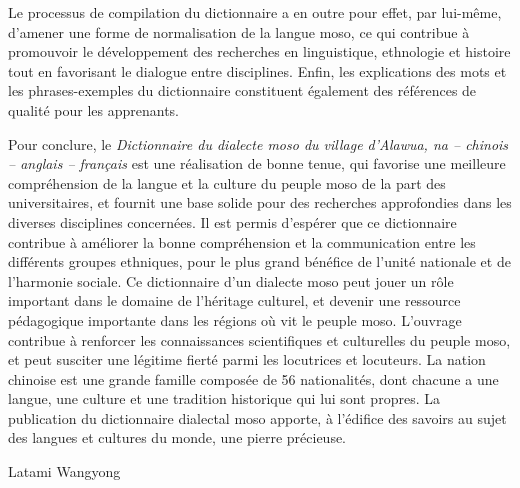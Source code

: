 Le processus de compilation du dictionnaire a en outre pour effet, par lui-même, d’amener une forme de normalisation de la langue moso, ce qui contribue à promouvoir le développement des recherches en linguistique, ethnologie et histoire tout en favorisant le dialogue entre disciplines. Enfin, les explications des mots et les phrases-exemples du dictionnaire constituent également des références de qualité pour les apprenants.

Pour conclure, le \emph{Dictionnaire du dialecte moso du village d'Alawua, na – chinois – anglais – français} est une réalisation de bonne tenue, qui favorise une meilleure compréhension de la langue et la culture du peuple moso de la part des universitaires, et fournit une base solide pour des recherches approfondies dans les diverses disciplines concernées. Il est permis d’espérer que ce dictionnaire contribue à améliorer la bonne compréhension et la communication entre les différents groupes ethniques, pour le plus grand bénéfice de l'unité nationale et de l'harmonie sociale. Ce dictionnaire d’un dialecte moso peut jouer un rôle important dans le domaine de l'héritage culturel, et devenir une ressource pédagogique importante dans les régions où vit le peuple moso. L’ouvrage contribue à renforcer les connaissances scientifiques et culturelles du peuple moso, et peut susciter une légitime fierté parmi les locutrices et locuteurs. La nation chinoise est une grande famille composée de 56 nationalités, dont chacune a une langue, une culture et une tradition historique qui lui sont propres. La publication du dictionnaire dialectal moso apporte, à l’édifice des savoirs au sujet des langues et cultures du monde, une pierre précieuse.


{\raggedleft Latami Wangyong \par}

